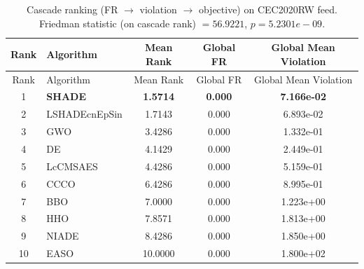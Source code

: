 \begin{center}
\small
\renewcommand{\arraystretch}{1.25}
\begin{longtable}{clccc}
\caption{Cascade ranking (FR $\to$ violation $\to$ objective) on CEC2020RW  feed. Friedman statistic (on cascade rank) $=56.9221$, $p=5.2301e-09$.}
\label{tab:cascade_ranking_CEC2020RW_feed} \\
\toprule
Rank & Algorithm & Mean Rank & Global FR & Global Mean Violation \\
\midrule
\endfirsthead
\toprule
Rank & Algorithm & Mean Rank & Global FR & Global Mean Violation \\
\midrule
\endhead
1 & \textbf{SHADE} & \textbf{1.5714} & \textbf{0.000} & \textbf{7.166e-02} \\
2 & LSHADEcnEpSin & 1.7143 & 0.000 & 6.893e-02 \\
3 & GWO & 3.4286 & 0.000 & 1.332e-01 \\
4 & DE & 4.1429 & 0.000 & 2.449e-01 \\
5 & LcCMSAES & 4.4286 & 0.000 & 5.159e-01 \\
6 & CCCO & 6.4286 & 0.000 & 8.995e-01 \\
7 & BBO & 7.0000 & 0.000 & 1.223e+00 \\
8 & HHO & 7.8571 & 0.000 & 1.813e+00 \\
9 & NIADE & 8.4286 & 0.000 & 1.850e+00 \\
10 & EASO & 10.0000 & 0.000 & 1.800e+02 \\
\bottomrule
\end{longtable}
\end{center}